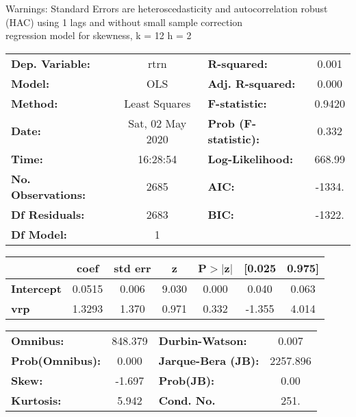 Warnings: \newline
 [1] Standard Errors are heteroscedasticity and autocorrelation robust (HAC) using 1 lags and without small sample correction\\ 

regression model for skewness, k = 12 h = 2\begin{center}
\begin{tabular}{lclc}
\toprule
\textbf{Dep. Variable:}    &       rtrn       & \textbf{  R-squared:         } &     0.001   \\
\textbf{Model:}            &       OLS        & \textbf{  Adj. R-squared:    } &     0.000   \\
\textbf{Method:}           &  Least Squares   & \textbf{  F-statistic:       } &    0.9420   \\
\textbf{Date:}             & Sat, 02 May 2020 & \textbf{  Prob (F-statistic):} &    0.332    \\
\textbf{Time:}             &     16:28:54     & \textbf{  Log-Likelihood:    } &    668.99   \\
\textbf{No. Observations:} &        2685      & \textbf{  AIC:               } &    -1334.   \\
\textbf{Df Residuals:}     &        2683      & \textbf{  BIC:               } &    -1322.   \\
\textbf{Df Model:}         &           1      & \textbf{                     } &             \\
\bottomrule
\end{tabular}
\begin{tabular}{lcccccc}
                   & \textbf{coef} & \textbf{std err} & \textbf{z} & \textbf{P$> |$z$|$} & \textbf{[0.025} & \textbf{0.975]}  \\
\midrule
\textbf{Intercept} &       0.0515  &        0.006     &     9.030  &         0.000        &        0.040    &        0.063     \\
\textbf{vrp}       &       1.3293  &        1.370     &     0.971  &         0.332        &       -1.355    &        4.014     \\
\bottomrule
\end{tabular}
\begin{tabular}{lclc}
\textbf{Omnibus:}       & 848.379 & \textbf{  Durbin-Watson:     } &    0.007  \\
\textbf{Prob(Omnibus):} &   0.000 & \textbf{  Jarque-Bera (JB):  } & 2257.896  \\
\textbf{Skew:}          &  -1.697 & \textbf{  Prob(JB):          } &     0.00  \\
\textbf{Kurtosis:}      &   5.942 & \textbf{  Cond. No.          } &     251.  \\
\bottomrule
\end{tabular}
\end{center}


